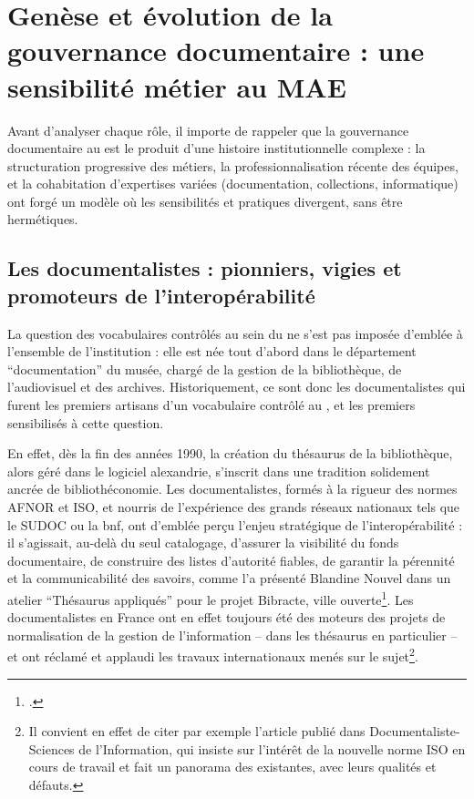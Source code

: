 \section{\label{II-B-1}Genèse et évolution de la gouvernance documentaire : une sensibilité métier au MAE}

Avant d’analyser chaque rôle, il importe de rappeler que la gouvernance documentaire au \mae est le produit d’une histoire institutionnelle complexe : la structuration progressive des métiers, la professionnalisation récente des équipes, et la cohabitation d’expertises variées (documentation, collections, informatique) ont forgé un modèle où les sensibilités et pratiques divergent, sans être hermétiques.

\subsection{Les documentalistes : pionniers, vigies et promoteurs de l’interopérabilité}

La question des vocabulaires contrôlés au sein du \mae ne s’est pas imposée d’emblée à l’ensemble de l’institution : elle est née tout d'abord dans le département \enquote{documentation} du musée, chargé de la gestion de la bibliothèque, de l'audiovisuel et des archives. Historiquement, ce sont donc les documentalistes qui furent les premiers artisans d'un vocabulaire contrôlé au \mae, et les premiers sensibilisés à cette question.

En effet, dès la fin des années 1990, la création du thésaurus de la bibliothèque, alors géré dans le logiciel \gls{alexandrie}, s’inscrit dans une tradition solidement ancrée de bibliothéconomie. Les documentalistes, formés à la rigueur des normes AFNOR et ISO, et nourris de l’expérience des grands réseaux nationaux tels que le SUDOC ou la \ac{bnf}, ont d’emblée perçu l’enjeu stratégique de l’interopérabilité : il s’agissait, au-delà du seul catalogage, d’assurer la visibilité du fonds documentaire, de construire des listes d’autorité fiables, de garantir la pérennité et la communicabilité des savoirs, comme l'a présenté Blandine Nouvel dans un atelier \enquote{Thésaurus appliqués} pour le projet Bibracte, ville ouverte\footcite{nouvelOutilsDindexationBibliothecaires2022}. Les documentalistes en France ont en effet toujours été des moteurs des projets de normalisation de la gestion de l'information -- dans les thésaurus en particulier -- et ont réclamé et applaudi les travaux internationaux menés sur le sujet\footnote{Il convient en effet de citer par exemple l'article  publié dans Documentaliste-Sciences de l'Information, qui insiste sur l'intérêt de la nouvelle norme ISO en cours de travail et fait un panorama des existantes, avec leurs qualités et défauts.}.

